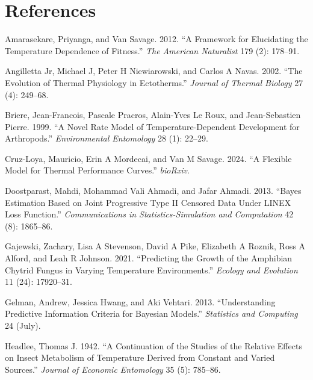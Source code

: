 \documentclass[
  12pt,
]{article}
\newlength{\cslhangindent}
\newenvironment{CSLReferences}[2] %
 {\begin{list}{}{%
  \setlength{\itemindent}{0pt}
  \setlength{\leftmargin}{0pt}
  \setlength{\parsep}{0pt}
  \ifodd #1
   \setlength{\leftmargin}{\cslhangindent}
   \setlength{\itemindent}{-1\cslhangindent}
  \fi
  \setlength{\itemsep}{#2\baselineskip}}}
 {\end{list}}
\begin{document}
\clearpage

\section{References}\label{references}

\label{refs}
\begin{CSLReferences}{1}{0}
Amarasekare, Priyanga, and Van Savage. 2012. {``A Framework for
Elucidating the Temperature Dependence of Fitness.''} \emph{The American
Naturalist} 179 (2): 178--91.

Angilletta Jr, Michael J, Peter H Niewiarowski, and Carlos A Navas.
2002. {``The Evolution of Thermal Physiology in Ectotherms.''}
\emph{Journal of Thermal Biology} 27 (4): 249--68.

Briere, Jean-Francois, Pascale Pracros, Alain-Yves Le Roux, and
Jean-Sebastien Pierre. 1999. {``A Novel Rate Model of
Temperature-Dependent Development for Arthropods.''} \emph{Environmental
Entomology} 28 (1): 22--29.

Cruz-Loya, Mauricio, Erin A Mordecai, and Van M Savage. 2024. {``A
Flexible Model for Thermal Performance Curves.''} \emph{bioRxiv}.

Doostparast, Mahdi, Mohammad Vali Ahmadi, and Jafar Ahmadi. 2013.
{``Bayes Estimation Based on Joint Progressive Type II Censored Data
Under LINEX Loss Function.''} \emph{Communications in
Statistics-Simulation and Computation} 42 (8): 1865--86.

Gajewski, Zachary, Lisa A Stevenson, David A Pike, Elizabeth A Roznik,
Ross A Alford, and Leah R Johnson. 2021. {``Predicting the Growth of the
Amphibian Chytrid Fungus in Varying Temperature Environments.''}
\emph{Ecology and Evolution} 11 (24): 17920--31.

Gelman, Andrew, Jessica Hwang, and Aki Vehtari. 2013. {``Understanding
Predictive Information Criteria for Bayesian Models.''} \emph{Statistics
and Computing} 24 (July).

Headlee, Thomas J. 1942. {``A Continuation of the Studies of the
Relative Effects on Insect Metabolism of Temperature Derived from
Constant and Varied Sources.''} \emph{Journal of Economic Entomology} 35
(5): 785--86.


\end{CSLReferences}
\end{document}
